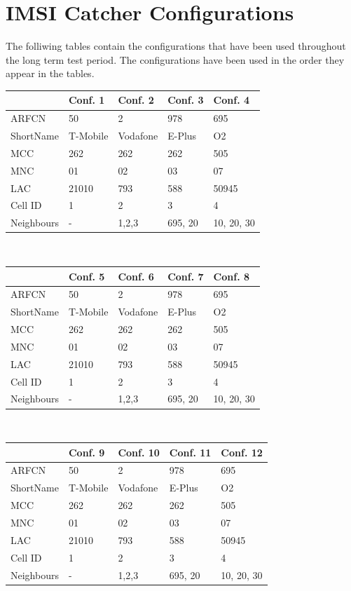 \section{IMSI Catcher Configurations}
\label{sec:config_data}
The folliwing tables contain the configurations that have been used throughout the long term test period.
The configurations have been used in the order they appear in the tables.
\begin{center}
\begin{tabular}{lllll}
\toprule
			&Conf. 1		&Conf. 2		&Conf. 3		&Conf. 4\\
\midrule
ARFCN		&50				&2				&978			&695	\\
ShortName	&T-Mobile		&Vodafone		&E-Plus			&O2		\\
MCC			&262			&262			&262			&505	\\
MNC			&01				&02				&03				&07		\\
LAC			&21010			&793			&588			&50945	\\
Cell ID		&1				&2				&3				&4		\\
Neighbours	&-				&1,2,3			&695, 20		&10, 20, 30\\
\bottomrule
\end{tabular}\\
\vspace{1cm}
\begin{tabular}{lllll}
\toprule
			&Conf. 5		&Conf. 6		&Conf. 7		&Conf. 8\\
\midrule
ARFCN		&50				&2				&978			&695	\\
ShortName	&T-Mobile		&Vodafone		&E-Plus			&O2		\\
MCC			&262			&262			&262			&505	\\
MNC			&01				&02				&03				&07		\\
LAC			&21010			&793			&588			&50945	\\
Cell ID		&1				&2				&3				&4		\\
Neighbours	&-				&1,2,3			&695, 20		&10, 20, 30\\
\bottomrule
\end{tabular}\\
\vspace{1cm}
\begin{tabular}{lllll}
\toprule
			&Conf. 9		&Conf. 10		&Conf. 11		&Conf. 12\\
\midrule
ARFCN		&50				&2				&978			&695	\\
ShortName	&T-Mobile		&Vodafone		&E-Plus			&O2		\\
MCC			&262			&262			&262			&505	\\
MNC			&01				&02				&03				&07		\\
LAC			&21010			&793			&588			&50945	\\
Cell ID		&1				&2				&3				&4		\\
Neighbours	&-				&1,2,3			&695, 20		&10, 20, 30\\
\bottomrule
\end{tabular}
\end{center}